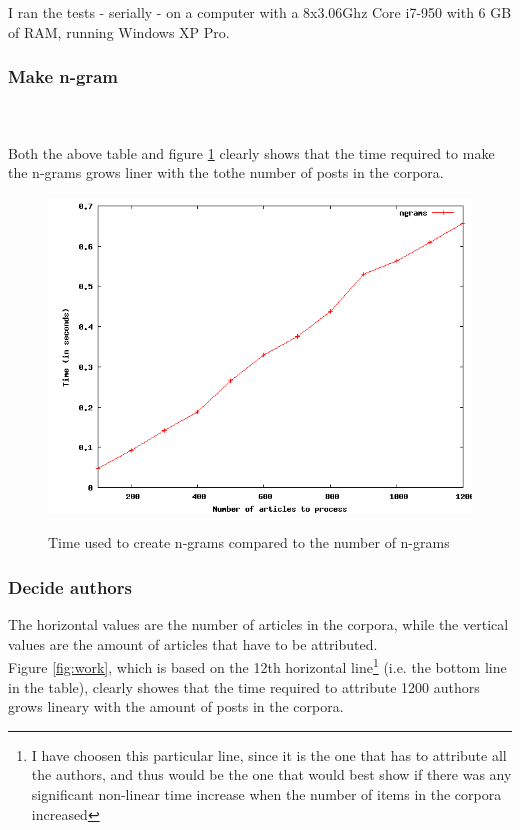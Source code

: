 I ran the tests - serially - on a computer with a 8x3.06Ghz Core i7-950 with 6 GB of RAM, running Windows XP Pro. 

\subsubsection{Make n-gram}
\\ \\

Both the above table and figure \ref{fig:ngram} clearly shows that the time required to make the n-grams grows liner with the tothe number of posts in the corpora.

\begin{figure}[!hbp]
\includegraphics[width=\textwidth]{tabeller/ngram.png}\\
\caption{Time used to create n-grams compared to the number of n-grams\label{fig:ngram}}
\end{figure}

\subsubsection{Decide authors}
The horizontal values are the number of articles in the corpora, while the vertical values are the amount of articles that have to be attributed.\\


Figure \ref{fig:work}, which is based on the 12th horizontal line\footnote{I have choosen this particular line, since it is the one that has to attribute all the authors, and thus would be the one that would best show if there was any significant non-linear time increase when the number of items in the corpora increased} (i.e. the bottom line in the table), clearly showes that the time required to attribute 1200 authors grows lineary with the amount of posts in the corpora. 

